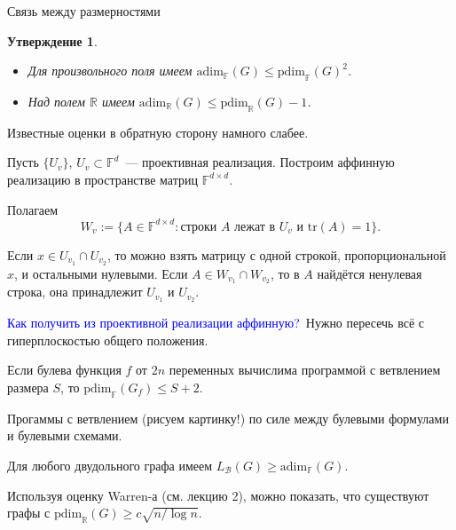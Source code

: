 \documentclass{beamer}
\renewcommand\le{\leqslant}
\renewcommand\ge{\geqslant}
\newcommand\R{\mathbb R}
\newtheorem*{statement}{Утверждение}
\begin{document}
\begin{frame}{Связь между размерностями}
    \begin{statement}
        \begin{itemize}
            \item Для произвольного поля имеем $\mathrm{adim}_{\mathbb
                F}(G)\le\mathrm{pdim}_{\mathbb F}(G)^2$.
            \item Над полем $\R$ имеем $\mathrm{adim}_{\mathbb R}(G)\le
                \mathrm{pdim}_{\mathbb R}(G)-1$.
        \end{itemize}
    \end{statement}
    Известные оценки в обратную сторону намного слабее.
    \pause\vspace{5pt}

    Пусть $\{U_v\}$, $U_v\subset\mathbb{F}^d$~--- проективная реализация.
    Построим аффинную реализацию в пространстве матриц $\mathbb{F}^{d\times d}$.
    \pause\vspace{5pt}
    
    Полагаем
    $$
    W_v := \{A\in\mathbb{F}^{d\times d}\colon \mbox{строки $A$ лежат в $U_v$ и
    $\mathrm{tr}(A)=1$}\}.
    $$
    \pause\vspace{5pt}

    Если $x\in U_{v_1}\cap U_{v_2}$, то можно взять матрицу с одной строкой,
    пропорциональной $x$, и остальными нулевыми. Если $A\in W_{v_1}\cap
    W_{v_2}$, то в $A$ найдётся ненулевая строка, она принадлежит $U_{v_1}$ и
    $U_{v_2}$.
    \pause\vspace{5pt}

    \textcolor{blue}{Как получить из проективной реализации
    аффинную?}\pause~Нужно пересечь всё с гиперплоскостью общего положения.

\end{frame}

\begin{frame}
    \begin{theorem}
        Если булева функция $f$ от $2n$ переменных вычислима программой с
        ветвлением размера $S$, то $\mathrm{pdim}_{\mathbb F}(G_f)\le S+2$.
    \end{theorem}
    \pause
    Прогаммы с ветвлением (рисуем картинку!) по силе между булевыми
    формулами и булевыми схемами.
    \pause\vspace{5pt}

    \begin{theorem}[Разборов, 1990]
        Для любого двудольного графа имеем 
        $L_{\mathcal B}(G)\ge \mathrm{adim}_{\mathbb F}(G)$.
    \end{theorem}
    \pause\vspace{5pt}

    Используя оценку Warren-а (см. лекцию 2), можно показать, что существуют
    графы с $\mathrm{pdim}_{\mathbb R}(G)\ge c\sqrt{n/\log n}$.

\end{frame}
\end{document}

